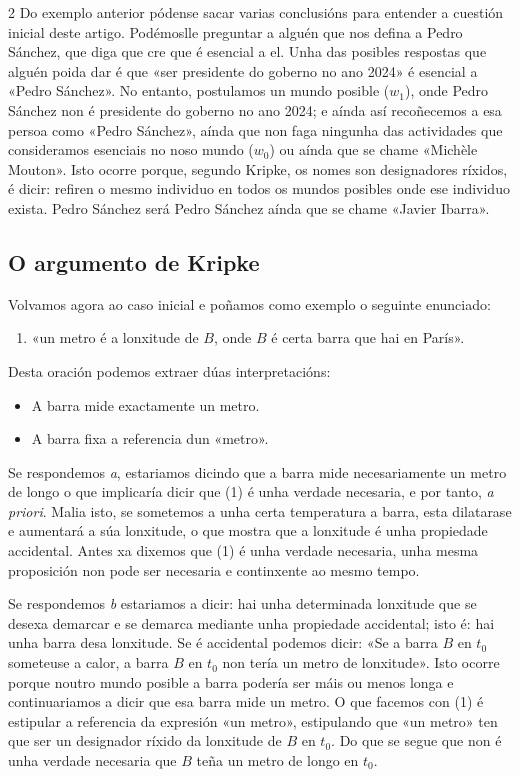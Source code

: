 \begin{multicols}{2}
Do exemplo anterior pódense sacar varias conclusións para entender a cuestión
inicial deste artigo. Podémoslle preguntar a alguén que nos defina a Pedro
Sánchez, que diga que cre que é esencial a el. Unha das posibles respostas que
alguén poida dar é que «ser presidente do goberno no ano 2024» é esencial a
«Pedro Sánchez». No entanto, postulamos un mundo posible ($w_1$), onde Pedro
Sánchez non é presidente do goberno no ano 2024; e aínda así recoñecemos a esa
persoa como «Pedro Sánchez», aínda que non faga ningunha das actividades que
consideramos esenciais no noso mundo ($w_0$) ou aínda que se chame «Michèle
Mouton». Isto ocorre porque, segundo Kripke, os nomes son designadores ríxidos,
é dicir: refiren o mesmo individuo en todos os mundos posibles onde ese
individuo exista. Pedro Sánchez será Pedro Sánchez aínda que se chame «Javier
Ibarra».

\subsection*{O argumento de Kripke}

Volvamos agora ao caso inicial e poñamos como exemplo o seguinte enunciado:

\begin{enumerate}
    \item[(1)] «un metro é a lonxitude de $B$, onde $B$ é certa barra que hai
        en París».
\end{enumerate}

\noindent Desta oración podemos extraer dúas interpretacións:

\begin{itemize}
    \item[a.] A barra mide exactamente un metro.
    \item[b.] A barra fixa a referencia dun «metro».
\end{itemize}

Se respondemos \textit{a}, estariamos dicindo que a barra mide necesariamente
un metro de longo o que implicaría dicir que (1) é unha verdade necesaria, e
por tanto, \textit{a priori}. Malia isto, se sometemos a unha certa temperatura
a barra, esta dilatarase e aumentará a súa lonxitude, o que mostra que a
lonxitude é unha propiedade accidental. Antes xa dixemos que (1) é unha verdade
necesaria, unha mesma proposición non pode ser necesaria e continxente ao mesmo
tempo.

Se respondemos \textit{b} estariamos a dicir: hai unha determinada lonxitude
que se desexa demarcar e se demarca mediante unha propiedade accidental; isto
é: hai unha barra desa lonxitude. Se é accidental podemos dicir: «Se a barra
$B$ en $t_0$ someteuse a calor, a barra $B$ en $t_0$ non tería un metro de
lonxitude». Isto ocorre porque noutro mundo posible a barra podería ser máis ou
menos longa e continuariamos a dicir que esa barra mide un metro. O que facemos
con (1) é estipular a referencia da expresión «un metro», estipulando que «un
metro» ten que ser un designador ríxido da lonxitude de $B$ en $t_0$. Do que se
segue que non é unha verdade necesaria que $B$ teña un metro de longo en $t_0$.


\end{multicols}
